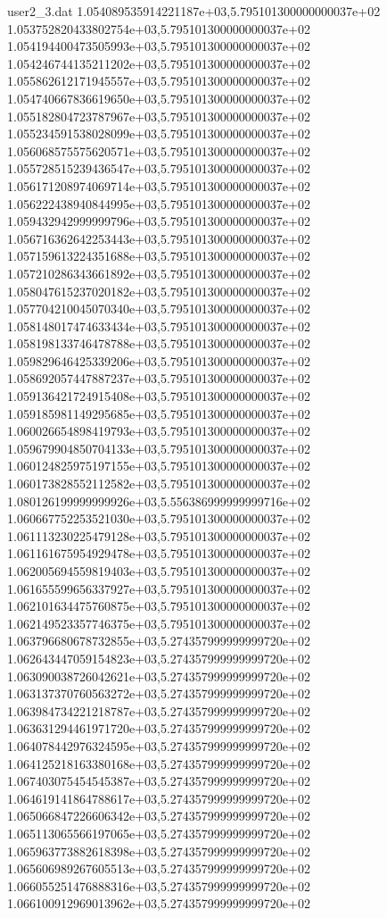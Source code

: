 \begin{filecontents}{user2_3.dat}
1.054089535914221187e+03,5.795101300000000037e+02
1.053752820433802754e+03,5.795101300000000037e+02
1.054194400473505993e+03,5.795101300000000037e+02
1.054246744135211202e+03,5.795101300000000037e+02
1.055862612171945557e+03,5.795101300000000037e+02
1.054740667836619650e+03,5.795101300000000037e+02
1.055182804723787967e+03,5.795101300000000037e+02
1.055234591538028099e+03,5.795101300000000037e+02
1.056068575575620571e+03,5.795101300000000037e+02
1.055728515239436547e+03,5.795101300000000037e+02
1.056171208974069714e+03,5.795101300000000037e+02
1.056222438940844995e+03,5.795101300000000037e+02
1.059432942999999796e+03,5.795101300000000037e+02
1.056716362642253443e+03,5.795101300000000037e+02
1.057159613224351688e+03,5.795101300000000037e+02
1.057210286343661892e+03,5.795101300000000037e+02
1.058047615237020182e+03,5.795101300000000037e+02
1.057704210045070340e+03,5.795101300000000037e+02
1.058148017474633434e+03,5.795101300000000037e+02
1.058198133746478788e+03,5.795101300000000037e+02
1.059829646425339206e+03,5.795101300000000037e+02
1.058692057447887237e+03,5.795101300000000037e+02
1.059136421724915408e+03,5.795101300000000037e+02
1.059185981149295685e+03,5.795101300000000037e+02
1.060026654898419793e+03,5.795101300000000037e+02
1.059679904850704133e+03,5.795101300000000037e+02
1.060124825975197155e+03,5.795101300000000037e+02
1.060173828552112582e+03,5.795101300000000037e+02
1.080126199999999926e+03,5.556386999999999716e+02
1.060667752253521030e+03,5.795101300000000037e+02
1.061113230225479128e+03,5.795101300000000037e+02
1.061161675954929478e+03,5.795101300000000037e+02
1.062005694559819403e+03,5.795101300000000037e+02
1.061655599656337927e+03,5.795101300000000037e+02
1.062101634475760875e+03,5.795101300000000037e+02
1.062149523357746375e+03,5.795101300000000037e+02
1.063796680678732855e+03,5.274357999999999720e+02
1.062643447059154823e+03,5.274357999999999720e+02
1.063090038726042621e+03,5.274357999999999720e+02
1.063137370760563272e+03,5.274357999999999720e+02
1.063984734221218787e+03,5.274357999999999720e+02
1.063631294461971720e+03,5.274357999999999720e+02
1.064078442976324595e+03,5.274357999999999720e+02
1.064125218163380168e+03,5.274357999999999720e+02
1.067403075454545387e+03,5.274357999999999720e+02
1.064619141864788617e+03,5.274357999999999720e+02
1.065066847226606342e+03,5.274357999999999720e+02
1.065113065566197065e+03,5.274357999999999720e+02
1.065963773882618398e+03,5.274357999999999720e+02
1.065606989267605513e+03,5.274357999999999720e+02
1.066055251476888316e+03,5.274357999999999720e+02
1.066100912969013962e+03,5.274357999999999720e+02

\end{filecontents}

